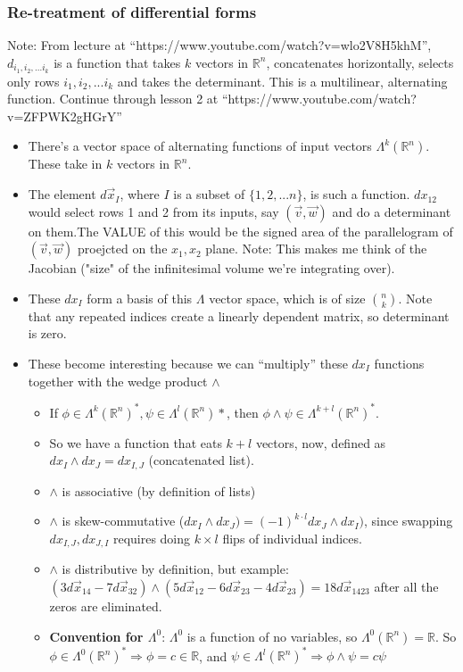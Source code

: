 \documentclass[11pt, oneside]{article}   	%
\begin{document}
\subsubsection{Re-treatment of differential forms}
Note: From lecture at ``https://www.youtube.com/watch?v=wlo2V8H5khM'', $d_{i_1, i_2, ... i_k}$ is a function that takes $k$ vectors in $\mathbb{R}^n$, concatenates horizontally, selects only rows $i_1, i_2, ... i_k$ and takes the determinant.  This is a multilinear, alternating function.  Continue through lesson 2 at ``https://www.youtube.com/watch?v=ZFPWK2gHGrY''

\begin{itemize}
\item There's a vector space of alternating functions of input vectors $\Lambda^k(\mathbb{R}^n)$.  These take in $k$ vectors in $\mathbb{R}^n$.  
\item The element $d\vec{x}_I$, where $I$ is a subset of $\{1, 2, ... n\}$, is such a function.  $dx_{12}$ would select rows 1 and 2 from its inputs, say $(\vec{v}, \vec{w})$ and do a determinant on them.The VALUE of this would be the signed area of the parallelogram of $(\vec{v}, \vec{w})$ proejcted on the $x_1, x_2$ plane.  Note: This makes me think of the Jacobian ("size" of the infinitesimal volume we're integrating over).
\item These $dx_I$ form a basis of this $\Lambda$ vector space, which is of size ${n \choose k}$.  Note that any repeated indices create a linearly dependent matrix, so determinant is zero.
\item These become interesting because we can ``multiply'' these $dx_I$ functions together with the wedge product $\wedge$
\begin{itemize}
\item If $\phi \in \Lambda^k(\mathbb{R}^n)^*, \psi \in \Lambda^l(\mathbb{R}^n)*$, then $\phi \wedge \psi \in \Lambda^{k+l}(\mathbb{R}^n)^*$.
\item So we have a function that eats $k + l$ vectors, now, defined as $dx_I \wedge dx_J = dx_{I, J}$ (concatenated list).  
\item $\wedge$ is associative (by definition of lists) 
\item $\wedge$ is skew-commutative ($dx_I \wedge dx_J) = (-1)^{k\cdot l} dx_J \wedge dx_I)$, since swapping $dx_{I,J}, dx_{J,I}$ requires doing $k \times l$ flips of individual indices.
\item $\wedge$ is distributive by definition, but example: $(3d\vec{x}_{14} - 7d\vec{x}_{32} ) \wedge (5d\vec{x}_{12} - 6d\vec{x}_{23} - 4d\vec{x}_{23}) = 18d\vec{x}_{1423}$ after all the zeros are eliminated.
\item \textbf{Convention for $\Lambda^0$}: $\Lambda^0$ is a function of no variables, so $\Lambda^0(\mathbb{R}^n) = \mathbb{R}$.  So $\phi \in \Lambda^0(\mathbb{R}^n)^* \Rightarrow \phi = c \in \mathbb{R}$, and $ \psi \in \Lambda^l(\mathbb{R}^n)^* \Rightarrow \phi \wedge \psi  = c\psi$
\end{itemize}


\end{itemize}
\end{document}
